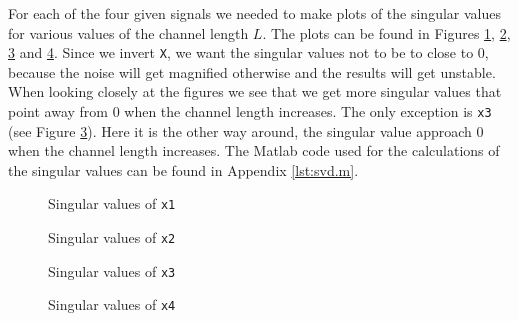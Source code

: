 \documentclass[final]{scrreprt} %
\begin{document}
For each of the four given signals we needed to make plots of the singular values for various values of the channel length $L$. 
The plots can be found in Figures \ref{fig:svd1}, \ref{fig:svd2}, \ref{fig:svd3} and \ref{fig:svd4}. 
Since we invert \texttt{X}, we want the singular values not to be to close to 0, because the noise will get magnified otherwise and the results will get unstable. 
\\
When looking closely at the figures we see that we get more singular values that point away from 0 when the channel length increases. 
The only exception is \texttt{x3} (see Figure \ref{fig:svd3}).
Here it is the other way around, the singular value approach 0 when the channel length increases. 
The Matlab code used for the calculations of the singular values can be found in Appendix \ref{lst:svd.m}.


\begin{figure}[H]
	\centering
    	\setlength\figureheight{6cm}
    	\setlength\figurewidth{10cm}
    	    	
    	\caption{Singular values of \texttt{x1}}
    	\label{fig:svd1}
\end{figure}

\begin{figure}[H]
	\centering
    	\setlength\figureheight{6cm}
    	\setlength\figurewidth{10cm}
    	    	
    	\caption{Singular values of \texttt{x2}}
    	\label{fig:svd2}
\end{figure}

\begin{figure}[H]
	\centering
    	\setlength\figureheight{6cm}
    	\setlength\figurewidth{10cm}
    	    	
    	\caption{Singular values of \texttt{x3}}
    	\label{fig:svd3}
\end{figure}

\begin{figure}[H]
	\centering
    	\setlength\figureheight{6cm}
    	\setlength\figurewidth{10cm}
    	    	
    	\caption{Singular values of \texttt{x4}}
    	\label{fig:svd4}
\end{figure}
\end{document}
